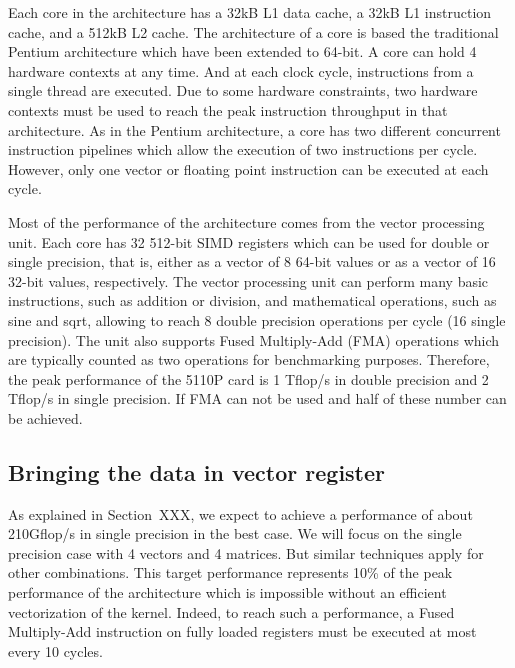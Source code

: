 \documentclass[10pt,conference,compsocconf]{IEEEtran}
\begin{document}
Each core in the architecture has a 32kB L1 data cache, a 32kB L1
instruction cache, and a 512kB L2 cache. The architecture of a core is
based the traditional Pentium architecture which have been extended to
64-bit. A core can hold 4 hardware contexts at any time. And at each
clock cycle, instructions from a single thread are executed. Due to
some hardware constraints, two hardware contexts must be used to reach
the peak instruction throughput in that architecture. As in the
Pentium architecture, a core has two different concurrent instruction
pipelines which allow the execution of two instructions per
cycle. However, only one vector or floating point instruction can be
executed at each cycle.

Most of the performance of the architecture comes from the vector
processing unit. Each core has 32 512-bit SIMD registers which can be
used for double or single precision, that is, either as a vector of 8
64-bit values or as a vector of 16 32-bit values, respectively. The
vector processing unit can perform many basic instructions, such as
addition or division, and mathematical operations, such as sine and
sqrt, allowing to reach 8 double precision operations per cycle (16
single precision). The unit also supports Fused Multiply-Add (FMA)
operations which are typically counted as two operations for
benchmarking purposes. Therefore, the peak performance of the 5110P
card is 1 Tflop/s in double precision and 2 Tflop/s in single
precision. If FMA can not be used and half of these number can be
achieved.


\subsection{Bringing the data in vector register}

As explained in Section~XXX, we expect to achieve a performance of
about 210Gflop/s in single precision in the best case. We will focus
on the single precision case with 4 vectors and 4 matrices. But
similar techniques apply for other combinations. This target
performance represents 10\% of the peak performance of the
architecture which is impossible without an efficient vectorization of
the kernel. Indeed, to reach such a performance, a Fused Multiply-Add
instruction on fully loaded registers must be executed at most every
10 cycles.
\end{document}
